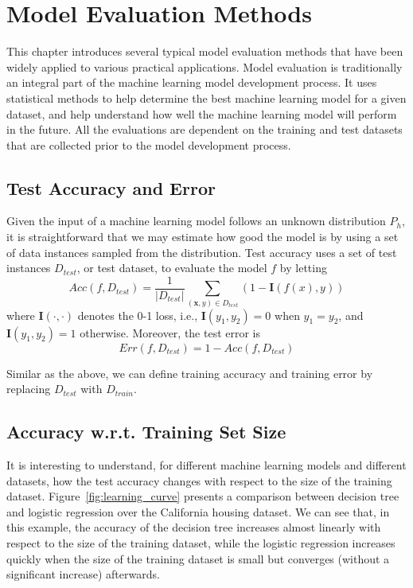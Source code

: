 \chapter{Model Evaluation Methods}\label{sec:usualevaluation}

This chapter introduces several typical model evaluation methods that have been widely applied to various practical applications. Model evaluation is traditionally an integral part of the machine learning model development process. It uses statistical methods to help determine the best machine learning model for a given dataset, and help understand how well the machine learning model will perform in the future. All the evaluations are dependent on the training and test datasets that are collected prior to the model development process. 

\section{Test Accuracy and Error}

Given the input of a machine learning model follows an unknown distribution $P_h$, it is straightforward that we may estimate how good the model is by using a set of data instances sampled from the distribution. 
%
Test accuracy uses a set of test instances $D_{test}$, or test dataset, to evaluate the model $f$ by letting 
\begin{equation}
    Acc(f,D_{test}) = \frac{1}{|D_{test}|}\sum_{(\textbf{x},y)\in D_{test}}(1-\textbf{I}(f(x),y))
\end{equation}
where $\textbf{I}(\cdot,\cdot)$ denotes the 0-1 loss, i.e.,  $\textbf{I}(y_1,y_2)=0$ when $y_1=y_2$, and $\textbf{I}(y_1,y_2)=1$ otherwise. 
%
Moreover, the test error is 
\begin{equation}\label{equ:testerror}
    Err(f,D_{test}) = 1 - Acc(f,D_{test})
\end{equation}

Similar as the above, we can define training accuracy and training error by replacing $D_{test}$ with $D_{train}$. 

\section{Accuracy w.r.t. Training Set Size}

It is interesting to understand, for different machine learning models and different datasets, how the test accuracy changes with respect to the size of the training dataset. Figure~\ref{fig:learning_curve} presents a comparison between decision tree and logistic regression over the California housing dataset. We can see that, in this example, the accuracy of the decision tree increases almost linearly with respect to the size of the training dataset, while the logistic regression increases quickly when the size of the training dataset is small but converges (without a significant increase) afterwards. 

